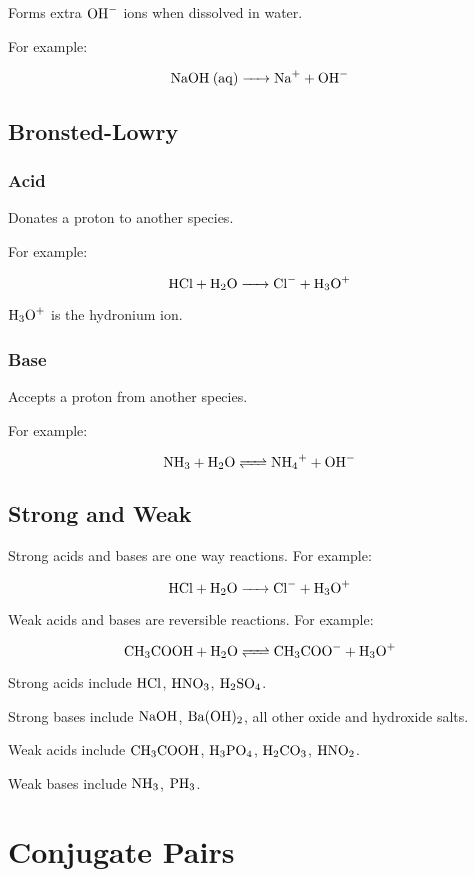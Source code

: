 \documentclass[a4paper,11pt]{article}
\begin{document}
Forms extra $\ce{OH-}$ ions when dissolved in water.

For example:

$$
\ce{NaOH (aq) -> Na+ + OH-}
$$


\subsection{Bronsted-Lowry}

\subsubsection{Acid}

Donates a proton to another species.

For example:

$$
\ce{HCl + H2O -> Cl- + H3O+}
$$

$\ce{H3O+}$ is the hydronium ion.


\subsubsection{Base}

Accepts a proton from another species.

For example:

$$
\ce{NH3 + H2O <=> NH4+ + OH-}
$$


\subsection{Strong and Weak}

Strong acids and bases are one way reactions. For example:

$$
\ce{HCl + H2O -> Cl- + H3O+}
$$

Weak acids and bases are reversible reactions. For example:

$$
\ce{CH3COOH + H2O <=> CH3COO- + H3O+}
$$

Strong acids include $\ce{HCl}$, $\ce{HNO3}$, $\ce{H2SO4}$.

Strong bases include $\ce{NaOH}$, $\ce{Ba(OH)2}$, all other oxide and hydroxide
salts.

Weak acids include $\ce{CH3COOH}$, $\ce{H3PO4}$, $\ce{H2CO3}$, $\ce{HNO2}$.

Weak bases include $\ce{NH3}$, $\ce{PH3}$.


\section{Conjugate Pairs}
\end{document}
